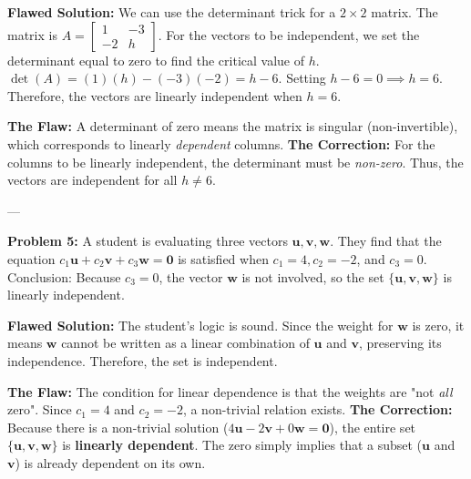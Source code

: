\documentclass[11pt]{article}
\begin{document}
\textbf{Flawed Solution:}
We can use the determinant trick for a $2 \times 2$ matrix. The matrix is $A = \begin{bmatrix} 1 & -3 \\ -2 & h \end{bmatrix}$. 
For the vectors to be independent, we set the determinant equal to zero to find the critical value of $h$.
$\det(A) = (1)(h) - (-3)(-2) = h - 6$.
Setting $h - 6 = 0 \implies h = 6$. 
Therefore, the vectors are linearly independent when $h = 6$.

\vspace{0.5cm}
\textbf{The Flaw:} A determinant of zero means the matrix is singular (non-invertible), which corresponds to linearly \textit{dependent} columns.
\textbf{The Correction:} For the columns to be linearly independent, the determinant must be \textit{non-zero}. Thus, the vectors are independent for all $h \neq 6$.

---

\textbf{Problem 5:} A student is evaluating three vectors $\mathbf{u}, \mathbf{v}, \mathbf{w}$. They find that the equation $c_1\mathbf{u} + c_2\mathbf{v} + c_3\mathbf{w} = \mathbf{0}$ is satisfied when $c_1 = 4, c_2 = -2$, and $c_3 = 0$. 
Conclusion: Because $c_3 = 0$, the vector $\mathbf{w}$ is not involved, so the set $\{\mathbf{u}, \mathbf{v}, \mathbf{w}\}$ is linearly independent.

\textbf{Flawed Solution:}
The student's logic is sound. Since the weight for $\mathbf{w}$ is zero, it means $\mathbf{w}$ cannot be written as a linear combination of $\mathbf{u}$ and $\mathbf{v}$, preserving its independence. Therefore, the set is independent.

\vspace{0.5cm}
\textbf{The Flaw:} The condition for linear dependence is that the weights are "not \textit{all} zero". Since $c_1=4$ and $c_2=-2$, a non-trivial relation exists.
\textbf{The Correction:} Because there is a non-trivial solution ($4\mathbf{u} - 2\mathbf{v} + 0\mathbf{w} = \mathbf{0}$), the entire set $\{\mathbf{u}, \mathbf{v}, \mathbf{w}\}$ is \textbf{linearly dependent}. The zero simply implies that a subset ($\mathbf{u}$ and $\mathbf{v}$) is already dependent on its own.
\end{document}
